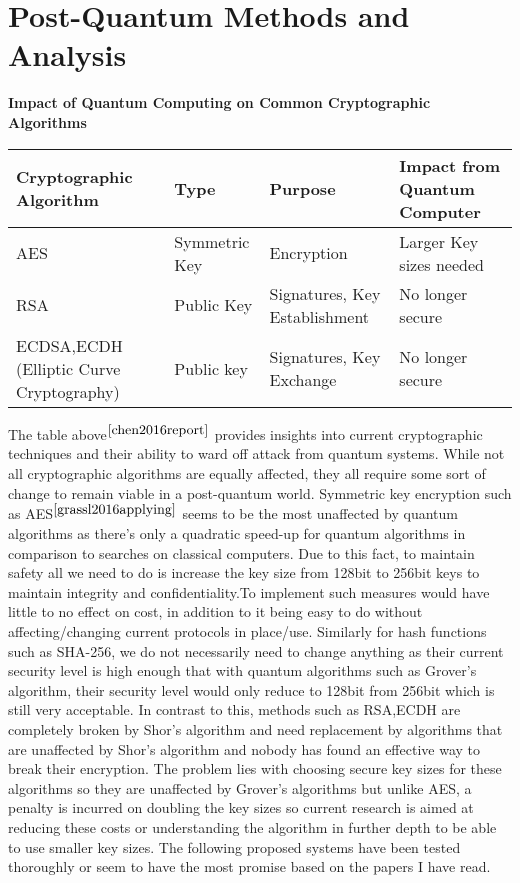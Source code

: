 \documentclass[10pt,a4paper]{IEEEtran}
\begin{document}
\section{Post-Quantum Methods and Analysis}
\begin{table*}
\begin{center}
	\textbf{Impact of Quantum Computing on Common Cryptographic Algorithms}
	\begin{tabular}{ | m{5cm} | m{2cm} | m{5cm} | m{4cm} | }
		\hline
		Cryptographic Algorithm & Type & Purpose & Impact from Quantum Computer \\
		\hline
		AES & Symmetric Key & Encryption & Larger Key sizes needed \\
		\hline
		RSA & Public Key & Signatures, Key Establishment & No longer secure \\
		\hline
		ECDSA,ECDH (Elliptic Curve Cryptography)  &Public key &Signatures, Key Exchange &No longer secure \\
		\hline
	\end{tabular}
\end{center}
\end{table*}
The table above\(^{\cite{chen2016report}}\) provides insights into current cryptographic techniques and their ability to ward off attack from quantum systems. While not all cryptographic algorithms are equally affected, they all require some sort of change to remain viable in a post-quantum world. Symmetric key encryption such as AES\(^{\cite{grassl2016applying}}\) seems to be the most unaffected by quantum algorithms as there's only a quadratic speed-up for quantum algorithms in comparison to searches on classical computers. Due to this fact, to maintain safety all we need to do is increase the key size from 128bit to 256bit keys to maintain integrity and confidentiality.To implement such measures would have little to no effect on cost, in addition to it being easy to do without affecting/changing current protocols in place/use. Similarly for hash functions such as SHA-256, we do not necessarily need to change anything as their current security level is high enough that with quantum algorithms such as Grover's algorithm, their security level would only reduce to 128bit from 256bit which is still very acceptable.
\newline
\newline
In contrast to this, methods such as RSA,ECDH are completely broken by Shor's algorithm and need replacement by algorithms that are unaffected by Shor's algorithm and nobody has found an effective way to break their encryption. The problem lies with choosing secure key sizes for these algorithms so they are unaffected by Grover's algorithms but unlike AES, a penalty is incurred on doubling the key sizes so current research is aimed at reducing these costs or understanding the algorithm in further depth to be able to use smaller key sizes. The following proposed systems have been tested thoroughly or seem to have the most promise based on the papers I have read.
\end{document}
